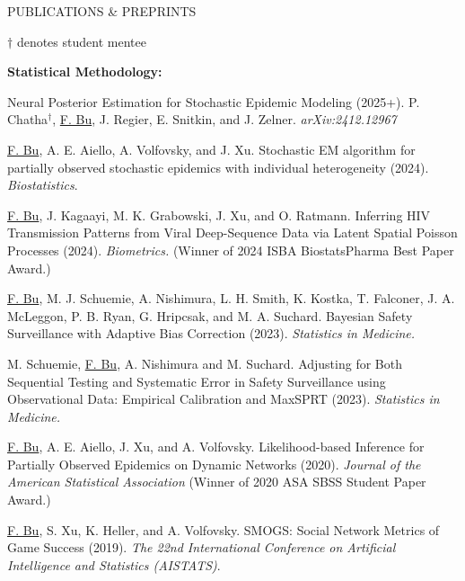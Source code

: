 \documentclass{resume} %
\newcommand{\myName}[1]{\underline{#1}}
\begin{document}


\begin{rSection}{PUBLICATIONS \& PREPRINTS}

{\footnotesize $\dagger$ denotes student mentee}

\hspace{-.2in} \textbf{Statistical Methodology:}

Neural Posterior Estimation for Stochastic Epidemic Modeling (2025+). P. Chatha$^\dagger$, \myName{F. Bu}, J. Regier, E. Snitkin, and J. Zelner. 	\textit{arXiv:2412.12967}

\smallskip

\myName{F. Bu}, A. E. Aiello, A. Volfovsky, and J. Xu.  
Stochastic EM algorithm for partially observed stochastic epidemics with individual heterogeneity (2024).  \emph{Biostatistics}.%

\smallskip

\myName{F. Bu}, J. Kagaayi, M. K. Grabowski, J. Xu, and O. Ratmann.
Inferring HIV Transmission Patterns from Viral Deep-Sequence Data via Latent Spatial Poisson Processes (2024). \emph{Biometrics.} 
(Winner of 2024 ISBA BiostatsPharma Best Paper Award.)

\smallskip

\myName{F. Bu}, M. J. Schuemie,  A. Nishimura, L. H. Smith, K. Kostka, T. Falconer, J. A. McLeggon, P. B. Ryan, G. Hripcsak, and M. A. Suchard.
Bayesian Safety Surveillance with Adaptive Bias Correction (2023). \emph{Statistics in Medicine.} %

\smallskip


M. Schuemie, \myName{F. Bu}, A. Nishimura and M. Suchard.
Adjusting for Both Sequential Testing and Systematic Error in Safety Surveillance using Observational Data: Empirical Calibration and MaxSPRT (2023). \emph{Statistics in Medicine.}

\smallskip


\myName{F. Bu}, A. E. Aiello, J. Xu, and A. Volfovsky. 
Likelihood-based Inference for Partially Observed Epidemics on Dynamic Networks (2020). \emph{Journal of the American Statistical Association} (Winner of 2020 ASA SBSS Student Paper Award.) %

\smallskip

\myName{F. Bu}, S. Xu, K. Heller, and A. Volfovsky. 
SMOGS: Social Network Metrics of Game Success (2019). \emph{The 22nd International Conference on Artificial Intelligence and Statistics (AISTATS)}. %


\end{rSection}
\end{document}
